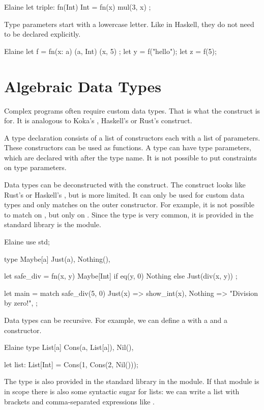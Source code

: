 \begin{lst}{Elaine}
let triple: fn(Int) Int = fn(x) { mul(3, x) };
\end{lst}
%
Type parameters start with a lowercase letter. Like in Haskell, they do not need to be declared explicitly.

\begin{lst}{Elaine}
let f = fn(x: a) (a, Int) {
    (x, 5)
};
let y = f("hello");
let z = f(5);
\end{lst}
%
\section{Algebraic Data Types}

Complex programs often require custom data types. That is what the  construct is for. It is analogous to Koka's , Haskell's  or Rust's  construct.

A type declaration consists of a list of constructors each with a list of parameters. These constructors can be used as functions. A type can have type parameters, which are declared with \el{[]} after the type name. It is not possible to put constraints on type parameters.

Data types can be deconstructed with the  construct. The  construct looks like Rust's  or Haskell's , but is more limited. It can only be used for custom data types and only matches on the outer constructor. For example, it is not possible to match on , but only on . Since the  type is very common, it is provided in the standard library is the  module.

\begin{lst}{Elaine}
use std;

type Maybe[a] {
    Just(a),
    Nothing(),
}

let safe_div = fn(x, y) Maybe[Int] {
    if eq(y, 0) {
        Nothing
    } else {
        Just(div(x, y))
    }
};

let main = match safe_div(5, 0) {
    Just(x) => show_int(x),
    Nothing => "Division by zero!",
};
\end{lst}
%
\indent Data types can be recursive. For example, we can define a  with a  and a  constructor.

\begin{lst}{Elaine}
type List[a] {
    Cons(a, List[a]),
    Nil(),
}

let list: List[Int] = Cons(1, Cons(2, Nil()));
\end{lst}
%
The  type is also provided in the standard library in the  module. If that module is in scope there is also some syntactic sugar for lists: we can write a list with brackets and comma-separated expressions like \el{[1, 2, 3]}.

